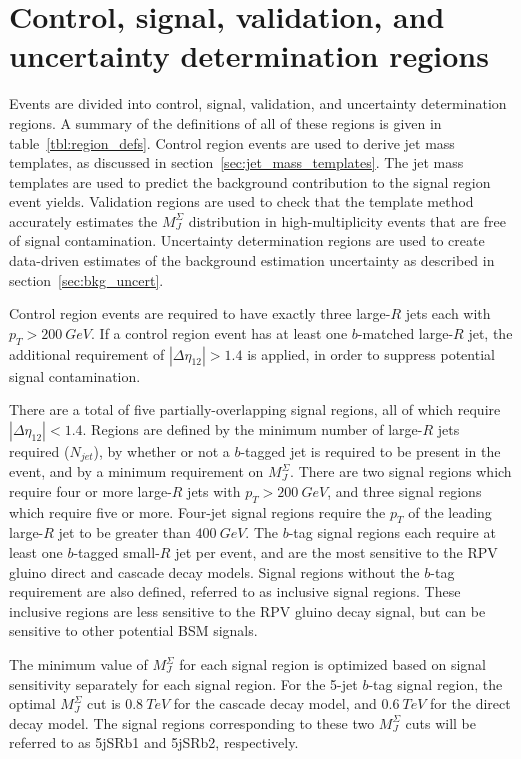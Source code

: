 \section{Control, signal, validation, and uncertainty determination regions} \label{sec:region_defs}
Events are divided into control, signal, validation, and uncertainty determination regions.
A summary of the definitions of all of these regions is given in table~\ref{tbl:region_defs}.
Control region events are used to derive jet mass templates, as discussed in section~\ref{sec:jet_mass_templates}.
The jet mass templates are used to predict the background contribution to the signal region event yields.
Validation regions are used to check that the template method accurately estimates the $M_J^{\Sigma}$ distribution in high-multiplicity events that are free of signal contamination.
Uncertainty determination regions are used to create data-driven estimates of the background estimation uncertainty as described in section~\ref{sec:bkg_uncert}.

Control region events are required to have exactly three large-$R$ jets each with $p_{T}>200~GeV$.
If a control region event has at least one $b$-matched large-$R$ jet, the additional requirement of $|\Delta\eta_{12}|>1.4$ is applied, in order to suppress potential signal contamination.

There are a total of five partially-overlapping signal regions, all of which require $|\Delta\eta_{12}|<1.4$.
Regions are defined by the minimum number of large-$R$ jets required ($N_{jet}$), by whether or not a $b$-tagged jet is required to be present in the event, and by a minimum requirement on $M_{J}^{\Sigma}$.
There are two signal regions which require four or more large-$R$ jets with $p_{T}>200~GeV$, and three signal regions which require five or more.
Four-jet signal regions require the $p_T$ of the leading large-$R$ jet to be greater than $400~GeV$.
The $b$-tag signal regions each require at least one $b$-tagged small-$R$ jet per event, and are the most sensitive to the RPV gluino direct and cascade decay models.
Signal regions without the $b$-tag requirement are also defined, referred to as inclusive signal regions.
These inclusive regions are less sensitive to the RPV gluino decay signal, but can be sensitive to other potential BSM signals.

The minimum value of $M_{J}^{\Sigma}$ for each signal region is optimized based on signal sensitivity separately for each signal region.
For the 5-jet $b$-tag signal region, the optimal $M_{J}^{\Sigma}$ cut is $0.8~TeV$ for the cascade decay model, and $0.6~TeV$ for the direct decay model.
The signal regions corresponding to these two $M_{J}^{\Sigma}$ cuts will be referred to as 5jSRb1 and 5jSRb2, respectively.

